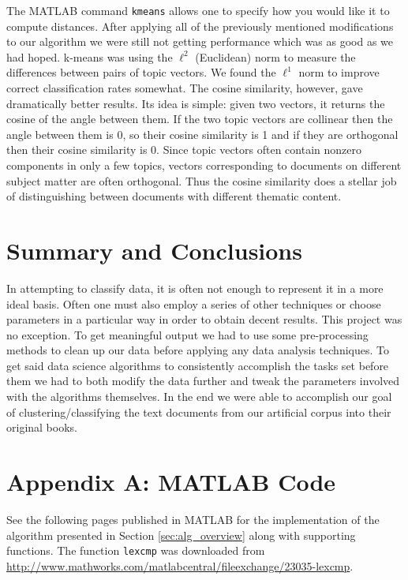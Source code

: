 \documentclass[fleqn,10pt]{../SelfArx} %
\begin{document}
The MATLAB command \texttt{kmeans} allows one to specify how you would like it to compute distances. After applying all of the previously mentioned modifications to our algorithm we were still not getting performance which was as good as we had hoped. k-means was using the $\ell^2$ (Euclidean) norm to measure the differences between pairs of topic vectors. We found the $\ell^1$ norm to improve correct classification rates somewhat. The cosine similarity, however, gave dramatically better results. Its idea is simple: given two vectors, it returns the cosine of the angle between them. If the two topic vectors are collinear then the angle between them is 0, so their cosine similarity is 1 and if they are orthogonal then their cosine similarity is 0. Since topic vectors often contain nonzero components in only a few topics, vectors corresponding to documents on different subject matter are often orthogonal. Thus the cosine similarity does a stellar job of distinguishing between documents with different thematic content.



\section{Summary and Conclusions} %
\label{sec:conclusion}
In attempting to classify data, it is often not enough to represent it in a more ideal basis. Often one must also employ a series of other techniques or choose parameters in a particular way in order to obtain decent results. This project was no exception. To get meaningful output we had to use some pre-processing methods to clean up our data before applying any data analysis techniques. To get said data science algorithms to consistently accomplish the tasks set before them we had to both modify the data further and tweak the parameters involved with the algorithms themselves. In the end we were able to accomplish our goal of clustering/classifying the text documents from our artificial corpus into their original books.







\section*{Appendix A: MATLAB Code}
See the following pages published in MATLAB for the implementation of the algorithm presented in Section \ref{sec:alg_overview} along with supporting functions. The function \texttt{lexcmp} was downloaded from \url{http://www.mathworks.com/matlabcentral/fileexchange/23035-lexcmp}.




\end{document}
